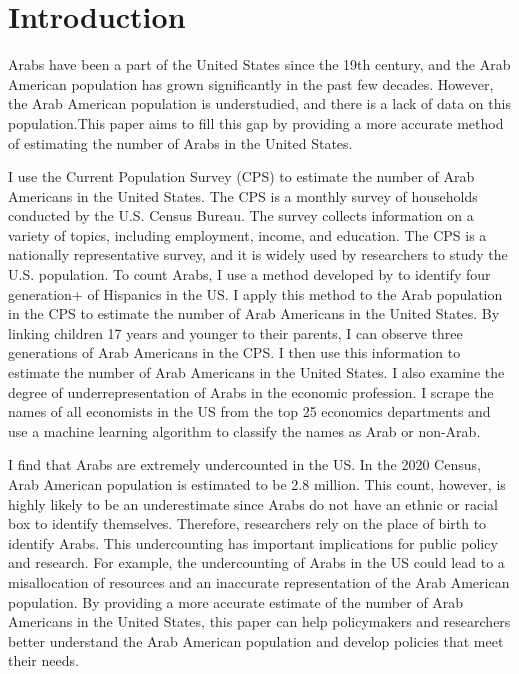 \section{Introduction}\label{sec:intro}

Arabs have been a part of the United States since the 19th century, and the Arab American population has grown significantly in the past few decades. However, the Arab American population is understudied, and there is a lack of data on this population.This paper aims to fill this gap by providing a more accurate method of estimating the number of Arabs in the United States. 

I use the Current Population Survey (CPS) to estimate the number of Arab Americans in the United States. The CPS is a monthly survey of households conducted by the U.S. Census Bureau. The survey collects information on a variety of topics, including employment, income, and education. The CPS is a nationally representative survey, and it is widely used by researchers to study the U.S. population. To count Arabs, I use a method developed by \textcite{antmanEthnicAttritionObserved2016} to identify four generation+ of Hispanics in the US. I apply this method to the Arab population in the CPS to estimate the number of Arab Americans in the United States. By linking children 17 years and younger to their parents, I can observe three generations of Arab Americans in the CPS. I then use this information to estimate the number of Arab Americans in the United States. I also examine the degree of underrepresentation of Arabs in the economic profession. I scrape the names of all economists in the US from the top 25 economics departments and use a machine learning algorithm to classify the names as Arab or non-Arab. 

I find that Arabs are extremely undercounted in the US. In the 2020 Census, Arab American population is estimated to be 2.8 million. This count, however, is highly likely to be an underestimate since Arabs do not have an ethnic or racial box to identify themselves. Therefore, researchers rely on the place of birth to identify Arabs. This undercounting has important implications for public policy and research. For example, the undercounting of Arabs in the US could lead to a misallocation of resources and an inaccurate representation of the Arab American population. By providing a more accurate estimate of the number of Arab Americans in the United States, this paper can help policymakers and researchers better understand the Arab American population and develop policies that meet their needs.

